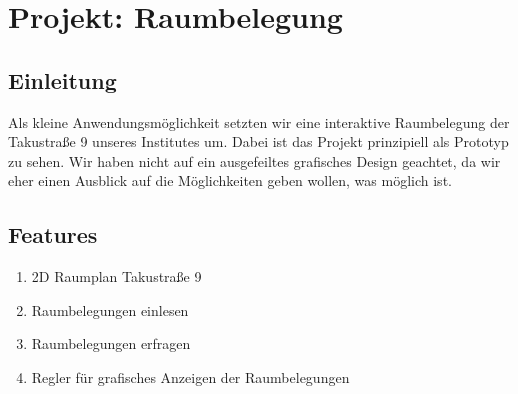 \section{Projekt: Raumbelegung}

\subsection{Einleitung}
Als kleine Anwendungsmöglichkeit setzten wir eine interaktive Raumbelegung der Takustraße 9 unseres Institutes um. Dabei ist das Projekt prinzipiell als Prototyp zu sehen. Wir haben nicht auf ein ausgefeiltes grafisches Design geachtet, da wir eher einen Ausblick auf die Möglichkeiten geben wollen, was möglich ist.

\subsection{Features}
\begin{enumerate}
	\item 2D Raumplan Takustraße 9
	\item Raumbelegungen einlesen
	\item Raumbelegungen erfragen
	\item Regler für grafisches Anzeigen der Raumbelegungen
\end{enumerate}


\newpage